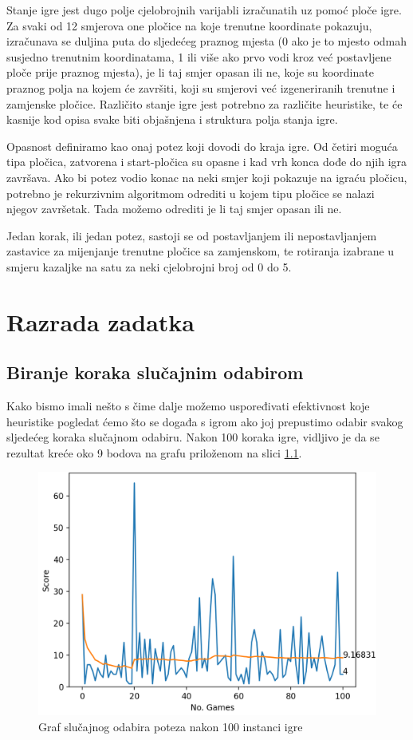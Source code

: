 \documentclass[zavrsnirad]{fer}
\begin{document}
Stanje igre jest dugo polje cjelobrojnih varijabli izračunatih uz pomoć ploče igre. Za svaki od 12 smjerova one pločice na koje trenutne koordinate pokazuju, izračunava se duljina puta do sljedećeg praznog mjesta (0 ako je to mjesto odmah susjedno trenutnim koordinatama, 1 ili više ako prvo vodi kroz već postavljene ploče prije praznog mjesta), je li taj smjer opasan ili ne, koje su koordinate praznog polja na kojem će završiti, koji su smjerovi već izgeneriranih trenutne i zamjenske pločice. Različito stanje igre jest potrebno za različite heuristike, te će kasnije kod opisa svake biti objašnjena i struktura polja stanja igre.

Opasnost definiramo kao onaj potez koji dovodi do kraja igre. Od četiri moguća tipa pločica, zatvorena i start-pločica su opasne i kad vrh konca dođe do njih igra završava. Ako bi potez vodio konac na neki smjer koji pokazuje na igraću pločicu, potrebno je rekurzivnim algoritmom odrediti u kojem tipu pločice se nalazi njegov završetak. Tada možemo odrediti je li taj smjer opasan ili ne.

Jedan korak, ili jedan potez, sastoji se od postavljanjem ili nepostavljanjem zastavice za mijenjanje trenutne pločice sa zamjenskom, te rotiranja izabrane u smjeru kazaljke na satu za neki cjelobrojni broj od 0 do 5.

\chapter{Razrada zadatka}
\label{pog:razrada_zadatka}

\section{Biranje koraka slučajnim odabirom}
\label{pog:slucajan_odabir}

Kako bismo imali nešto s čime dalje možemo uspoređivati efektivnost koje heuristike pogledat ćemo što se događa s igrom ako joj prepustimo odabir svakog sljedećeg koraka slučajnom odabiru. Nakon 100 koraka igre, vidljivo je da se rezultat kreće oko 9 bodova na grafu priloženom na slici \ref{slk:random_graph}.


\begin{figure}[htb]
	\centering
	\includegraphics[width=0.68\linewidth]{Figures/random.png} 
	\caption{Graf slučajnog odabira poteza nakon 100 instanci igre}
	\label{slk:random_graph}
\end{figure}
\end{document}
